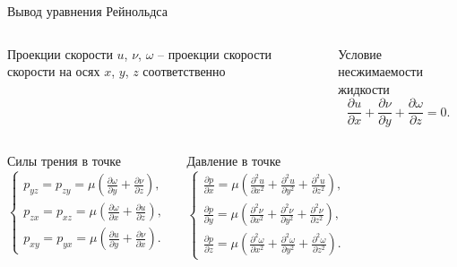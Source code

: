 \documentclass[ignoreonframetext,unicode]{beamer}
\begin{document}
\begin{frame}{Вывод уравнения Рейнольдса}

\begin{columns}
	\begin{block}{Проекции скорости}
		$u$, $\nu$, $\omega$ -- проекции скорости скорости на осях $x$, $y$, $z$ соответственно
	\end{block}
	
	\begin{block}{Условие несжимаемости жидкости}	
		\[
		\frac{\partial u}{\partial x} + \frac{\partial \nu}{\partial y} + \frac{\partial \omega}{\partial z} = 0.
		\]
	\end{block}
\end{columns}

\begin{columns}
\begin{block}{Силы трения в точке}	
	\[
	\begin{cases}
		p_{yz} = p_{zy} = \mu \left(\frac{\partial \omega}{\partial y} + \frac{\partial \nu}{\partial z} \right), \\
		p_{zx} = p_{xz} = \mu \left( \frac{\partial \omega}{\partial x} +  \frac{\partial u}{\partial z} \right), \\
		p_{xy} = p_{yx} = \mu \left(  \frac{\partial u}{\partial y} + \frac{\partial \nu}{\partial x} \right).
	\end{cases}
	\]
\end{block}

\begin{block}{Давление в
		точке}
	\[
	\begin{cases}
		\frac{\partial p}{\partial x} = \mu \left( \frac{\partial^2 u}{\partial x^2} + \frac{\partial^2 u}{\partial y^2} + \frac{\partial^2 u}{\partial z^2} \right), \\
		\frac{\partial p}{\partial y} = \mu \left( \frac{\partial^2 \nu}{\partial x^2} + \frac{\partial^2 \nu}{\partial y^2} + \frac{\partial^2 \nu}{\partial z^2} \right), \\
		\frac{\partial p}{\partial z} = \mu \left( \frac{\partial^2 \omega}{\partial x^2} + \frac{\partial^2 \omega}{\partial y^2} + \frac{\partial^2 \omega}{\partial z^2} \right).
	\end{cases}
	\]
\end{block}
\end{columns}
	
\end{frame}	
\end{document}
